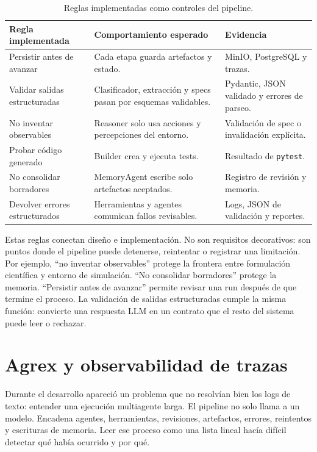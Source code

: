 \begin{table}[H]
\begin{center}
\small
\begin{tabular}{|p{3.2cm}|p{5.1cm}|p{4.1cm}|} \hline
\textbf{Regla implementada} & \textbf{Comportamiento esperado} & \textbf{Evidencia} \\ \hline
Persistir antes de avanzar & Cada etapa guarda artefactos y estado. & MinIO, PostgreSQL y trazas. \\ \hline
Validar salidas estructuradas & Clasificador, extracción y specs pasan por esquemas validables. & Pydantic, JSON validado y errores de parseo. \\ \hline
No inventar observables & Reasoner solo usa acciones y percepciones del entorno. & Validación de spec o invalidación explícita. \\ \hline
Probar código generado & Builder crea y ejecuta tests. & Resultado de \texttt{pytest}. \\ \hline
No consolidar borradores & MemoryAgent escribe solo artefactos aceptados. & Registro de revisión y memoria. \\ \hline
Devolver errores estructurados & Herramientas y agentes comunican fallos revisables. & Logs, JSON de validación y reportes. \\ \hline
\end{tabular}
\caption{Reglas implementadas como controles del pipeline.}
\end{center}
\end{table}

Estas reglas conectan diseño e implementación. No son requisitos decorativos:
son puntos donde el pipeline puede detenerse, reintentar o registrar una
limitación. Por ejemplo, ``no inventar observables'' protege la frontera entre
formulación científica y entorno de simulación. ``No consolidar borradores''
protege la memoria. ``Persistir antes de avanzar'' permite revisar una run
después de que termine el proceso.
La validación de salidas estructuradas cumple la misma función: convierte una
respuesta LLM en un contrato que el resto del sistema puede leer o rechazar.

\section{Agrex y observabilidad de trazas}

Durante el desarrollo apareció un problema que no resolvían bien los logs de
texto: entender una ejecución multiagente larga. El pipeline no solo llama a un
modelo. Encadena agentes, herramientas, revisiones, artefactos, errores,
reintentos y escrituras de memoria. Leer ese proceso como una lista lineal hacía
difícil detectar qué había ocurrido y por qué.

